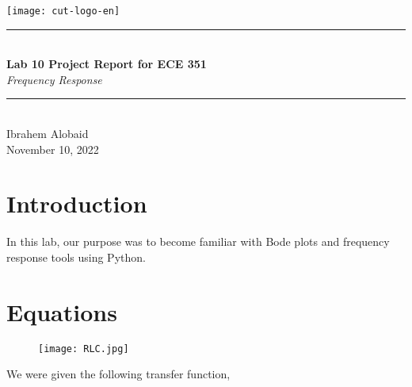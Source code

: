 \documentclass[12pt,a4paper]{article}
\newcommand{\HRule}{\rule{\linewidth}{0.5mm}}
\begin{document}
\begin{titlepage}
\begin{center}
\texttt{[image: cut-logo-en]}~\\[2cm]
\HRule \\[0.4cm]
{ \LARGE 
  \textbf{Lab 10 Project Report for ECE 351}\\[0.4cm]
  \emph{Frequency Response}\\[0.4cm]
}
\HRule \\[1.5cm]
{ \large
  Ibrahem Alobaid \\[0.1cm]
  November 10, 2022\\[0.1cm]
}
\vfill

\end{center}
\end{titlepage}
\newpage
\tableofcontents
{}
\newpage
\setcounter{page}{1}
\section{Introduction}\label{sec:intro}
    In this lab, our purpose was to become familiar with Bode plots and frequency response tools using Python.

\section{Equations}\label{sec:lit-rev}

\begin{figure}[h]
    \centering
    \texttt{[image: RLC.jpg]}
\end{figure}\textbf{}

We were given the following transfer function,
\end{document}
